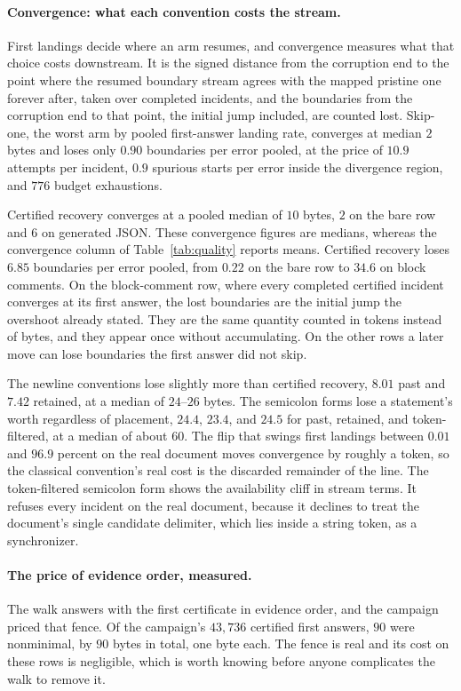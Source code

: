 \documentclass[11pt,a4paper]{article}
\theoremstyle{definition}
\theoremstyle{plain}
\theoremstyle{remark}
\begin{document}
\paragraph{Convergence: what each convention costs the stream.} First landings decide where an arm resumes, and
convergence measures what that choice costs downstream. It is the signed distance from the corruption end to the point
where the resumed boundary stream agrees with the mapped pristine one forever after, taken over completed incidents, and
the boundaries from the corruption end to that point, the initial jump included, are counted lost. Skip-one, the worst
arm by pooled first-answer landing rate, converges at median $2$ bytes and loses only $0.90$ boundaries per error
pooled, at the price of $10.9$ attempts per incident, $0.9$ spurious starts per error inside the divergence region, and
$776$ budget exhaustions.

Certified recovery converges at a pooled median of $10$ bytes, $2$ on the bare row and $6$ on generated JSON. These
convergence figures are medians, whereas the convergence column of Table~\ref{tab:quality} reports means. Certified
recovery loses $6.85$ boundaries per error pooled, from $0.22$ on the bare row to $34.6$ on block comments. On the
block-comment row, where every completed certified incident converges at its first answer, the lost boundaries are the
initial jump the overshoot already stated. They are the same quantity counted in tokens instead of bytes, and they
appear once without accumulating. On the other rows a later move can lose boundaries the first answer did not skip.

The newline conventions lose slightly more than certified recovery, $8.01$ past and $7.42$ retained, at a median of
$24$--$26$ bytes. The semicolon forms lose a statement's worth regardless of placement, $24.4$, $23.4$, and $24.5$ for
past, retained, and token-filtered, at a median of about $60$. The flip that swings first landings between $0.01$ and
$96.9$ percent on the real document moves convergence by roughly a token, so the classical convention's real cost is the
discarded remainder of the line. The token-filtered semicolon form shows the availability cliff in stream terms. It
refuses every incident on the real document, because it declines to treat the document's single candidate delimiter,
which lies inside a string token, as a synchronizer.

\paragraph{The price of evidence order, measured.} The walk answers with the first certificate in evidence order, and
the campaign priced that fence. Of the campaign's $43{,}736$ certified first answers, $90$ were nonminimal, by $90$
bytes in total, one byte each. The fence is real and its cost on these rows is negligible, which is worth knowing before
anyone complicates the walk to remove it.
\end{document}
